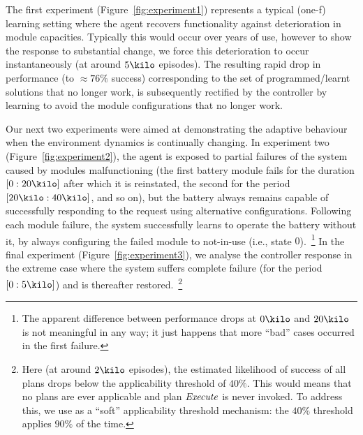 %
The first experiment (Figure~\ref{fig:experiment1}) represents a typical (one-f) learning setting where the agent recovers functionality against deterioration in module capacities. Typically this would occur over years of use, however to show the response to substantial change, we force this deterioration to occur instantaneously (at around $5\kilo$ episodes). The resulting rapid drop in performance (to $\approx 76\%$ success) corresponding to the set of programmed/learnt solutions that no longer work, is subsequently rectified by the controller by learning to avoid the module configurations that no longer work. 

Our next two experiments were aimed at demonstrating the adaptive behaviour when the environment dynamics is continually changing.
%
In experiment two (Figure~\ref{fig:experiment2}), the agent is exposed to partial failures of the system caused by modules malfunctioning (the first battery module fails for the duration $[0:20\kilo]$ after which it is reinstated, the second for the period $[20\kilo:40\kilo]$, and so on), but the battery always remains capable of successfully responding to the request using alternative configurations. Following each module failure, the system successfully learns to operate the battery without it, by always configuring the failed module to not-in-use (i.e., state $0$).~\footnote{The apparent difference between performance drops at $0\kilo$ and $20\kilo$ is not meaningful in any way; it just happens that more ``bad'' cases occurred in the first failure.} 
%
In the final experiment (Figure~\ref{fig:experiment3}), we analyse the controller response in the extreme case where the system suffers complete failure (for the period $[0:5\kilo]$) and is thereafter restored.~\footnote{Here (at around $2\kilo$ episodes), the estimated likelihood of success of all plans drops below the applicability threshold of $40\%$. This would means that no plans are ever applicable and plan $\operatorname{\textit{Execute}}$ is never invoked. To address this, we use as a ``soft'' applicability threshold mechanism: the $40\%$ threshold applies $90\%$ of the time.}
